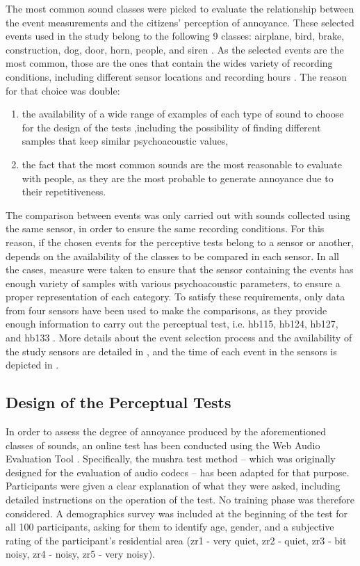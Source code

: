    The most common sound classes were picked to evaluate the relationship between the event measurements and the citizens' perception of annoyance. These selected events used in the study belong to the following 9 classes: airplane, bird, brake, construction, dog, door, horn, people, and siren . As the selected events are the most common, those are the ones that contain the wides variety of recording conditions, including different sensor locations and recording hours . The reason for that choice was double:

   \begin{enumerate}
     \item the availability of a wide range of examples of each type of sound to choose for the design of the tests ,including the possibility of finding different samples that keep similar psychoacoustic values,
     \item the fact that the most common sounds are the most reasonable to evaluate with people, as they are the most probable to generate annoyance due to their repetitiveness.
   \end{enumerate}
   The comparison between events was only carried out with sounds collected using the same sensor, in order to ensure the same recording conditions. For this reason, if the chosen events for the perceptive tests belong to a sensor or another, depends on the availability of the classes to be compared in each sensor. In all the cases, measure were taken to ensure that the sensor containing the events has enough variety of samples with various psychoacoustic parameters, to ensure a proper representation of each category. To satisfy these requirements, only data from four sensors have been used to make the comparisons, as they provide enough information to carry out the perceptual test, i.e. hb115, hb124, hb127, and hb133 . More details about the event selection process and the availability of the study sensors are detailed in , and the time of each event in the sensors is depicted in .

 \subsection{Design of the Perceptual Tests}

   In order to assess the degree of annoyance produced by the aforementioned classes of sounds, an online test has been conducted using the Web Audio Evaluation Tool . Specifically, the \gls{mushra} test method  -- which was originally designed for the evaluation of audio codecs -- has been adapted for that purpose. Participants were given a clear explanation of what they were asked, including detailed instructions on the operation of the test. No training phase was therefore considered. A demographics survey was included at the beginning of the test for all 100 participants, asking for them to identify age, gender, and a subjective rating of the participant's residential area (zr1 - very quiet, zr2 - quiet, zr3 - bit noisy, zr4 - noisy, zr5 - very noisy).


